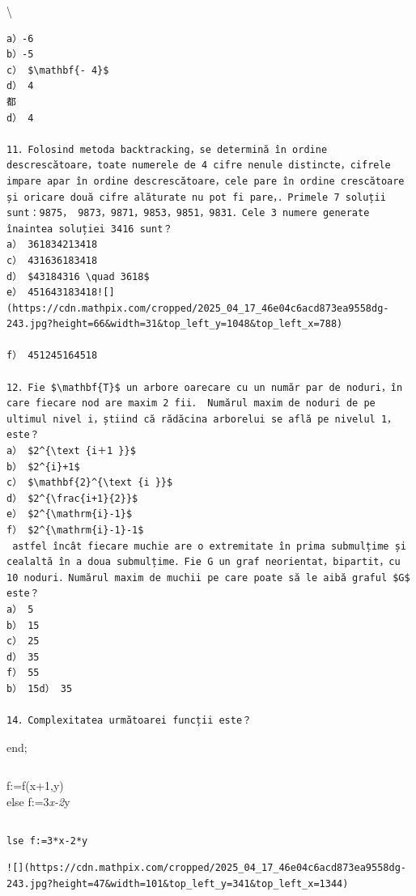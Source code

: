 \documentclass[10pt]{article}
\begin{document}
\textbackslash 

\begin{verbatim}
a）-6
b）-5
c） $\mathbf{- 4}$
d） 4
都
d） 4

11．Folosind metoda backtracking，se determină în ordine descrescătoare，toate numerele de 4 cifre nenule distincte，cifrele impare apar în ordine descrescătoare，cele pare în ordine crescătoare și oricare două cifre alăturate nu pot fi pare，．Primele 7 soluții sunt：9875， 9873，9871，9853，9851，9831．Cele 3 numere generate înaintea soluției 3416 sunt？
a） 361834213418
c） 431636183418
d） $43184316 \quad 3618$
e） 451643183418![](https://cdn.mathpix.com/cropped/2025_04_17_46e04c6acd873ea9558dg-243.jpg?height=66&width=31&top_left_y=1048&top_left_x=788)

f） 451245164518

12．Fie $\mathbf{T}$ un arbore oarecare cu un număr par de noduri，în care fiecare nod are maxim 2 fii． Numărul maxim de noduri de pe ultimul nivel i，știind că rădăcina arborelui se află pe nivelul 1，este？
a） $2^{\text {i＋1 }}$
b） $2^{i}+1$
c） $\mathbf{2}^{\text {i }}$
d） $2^{\frac{i+1}{2}}$
e） $2^{\mathrm{i}-1}$
f） $2^{\mathrm{i}-1}-1$
 astfel încât fiecare muchie are o extremitate în prima submulțime și cealaltă în a doua submulțime．Fie G un graf neorientat，bipartit，cu 10 noduri．Numărul maxim de muchii pe care poate să le aibă graful $G$ este？
a） 5
b） 15
c） 25
d） 35
f） 55
b） 15d） 35

14．Complexitatea următoarei funcții este？
\end{verbatim}

end;

\begin{verbatim}

\end{verbatim}

f:=f(x+1,y)\\
else f:=3\textit{x-2}y

\begin{verbatim}

\end{verbatim}

\begin{verbatim}
lse f:=3*x-2*y
\end{verbatim}

\begin{verbatim}
![](https://cdn.mathpix.com/cropped/2025_04_17_46e04c6acd873ea9558dg-243.jpg?height=47&width=101&top_left_y=341&top_left_x=1344)
                                                    
\end{verbatim}
\end{document}
